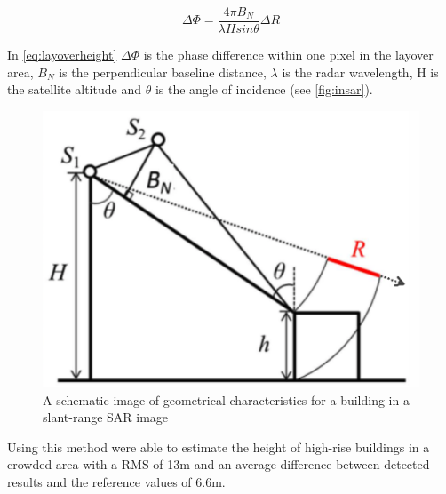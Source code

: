 \begin{equation}
	\Delta\Phi=\frac{4 \pi B_{N}}{\lambda H sin{\theta}}\Delta R
	\label{eq:layoverheight}
\end{equation}

In \autoref{eq:layoverheight} $\Delta\Phi$ is the phase difference within one pixel in the layover area, $B_{N}$ is the perpendicular baseline distance, $\lambda$ is the radar wavelength, H is the satellite altitude and $\theta$ is the angle of incidence (see \autoref{fig:insar}).

\begin{figure}[!h]
	\centering
	\includegraphics[scale=0.4]{fig/insar.png}
	\caption{A schematic image of geometrical characteristics for a building in a slant-range SAR image \citep{Liu2015}}
	\label{fig:insar}
\end{figure}

Using this method \cite{Liu2015} were able to estimate the height of high-rise buildings in a crowded area with a RMS of 13m and an average difference between detected results and the reference values of 6.6m.